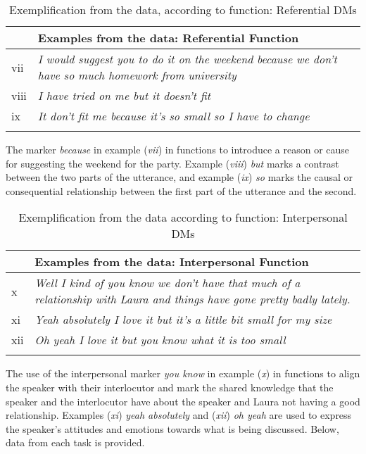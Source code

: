 \documentclass[output=paper]{langsci/langscibook}
\begin{document}
\begin{table}
\caption{\label{tab:ament:4} Exemplification from the data, according to function: Referential DMs}

\begin{tabularx}{\textwidth}{lQ}
\lsptoprule
&\bfseries Examples from the data: Referential Function\\
\midrule

vii &  \textit{I would suggest you to do it on the weekend because we don’t have so much homework from university}\\

viii &  \textit{I have tried on me but it doesn’t fit}\\

ix &   \textit{It don’t fit me because it’s so small so I have to change}\\
\lspbottomrule
\end{tabularx}
\end{table}

The  marker \textit{because} in example (\textit{vii}) in  functions to introduce a reason or cause for suggesting the weekend for the party. Example (\textit{viii}) \textit{but} marks a contrast between the two parts of the utterance, and example (\textit{ix}) \textit{so} marks the causal or consequential relationship between the first part of the utterance and the second.  

\begin{table}
\caption{\label{tab:ament:5} Exemplification from the data according to function: Interpersonal DMs}

\begin{tabularx}{\textwidth}{lQ}
\lsptoprule
&\bfseries Examples from the data: Interpersonal Function\\
\midrule

x & \textit{Well I kind of you know we don’t have that much of a relationship with Laura and things have gone pretty badly lately.}
\\
xi & \textit{Yeah absolutely I love it but it’s a little bit small for my size}\\

xii & \textit{Oh yeah I love it but you know what it is too small}\\
\lspbottomrule
\end{tabularx}
\end{table}


The use of the interpersonal marker \textit{you know} in example (\textit{x}) in  functions to align the speaker with their interlocutor and mark the shared knowledge that the speaker and the interlocutor have about the speaker and Laura not having a good relationship. Examples (\textit{xi}) \textit{yeah absolutely} and (\textit{xii}) \textit{oh yeah} are used to express the speaker’s attitudes and emotions towards what is being discussed.  Below, data from each task is provided. 
\end{document}

